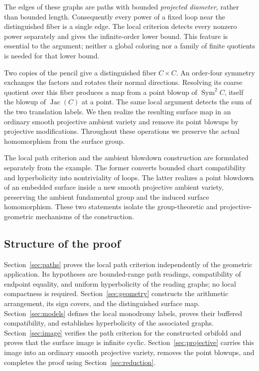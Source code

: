 \documentclass[11pt,reqno]{amsart}
\numberwithin{equation}{section}
\theoremstyle{definition}
\theoremstyle{remark}
\DeclareMathOperator{\Sym}{Sym}
\DeclareMathOperator{\Jac}{Jac}
\begin{document}
The edges of these graphs are paths with bounded \emph{projected
diameter}, rather than bounded length.  Consequently every power of a
fixed loop near the distinguished fiber is a single edge.  The local
criterion detects every nonzero power separately and gives the
infinite-order lower bound.  This feature is essential to the argument;
neither a global coloring nor a family of finite quotients is needed
for that lower bound.

Two copies of the pencil give a distinguished fiber $C\times C$.
An order-four symmetry exchanges the factors and rotates their normal
directions.  Resolving its coarse quotient over this fiber produces a
map from a point blowup of
$\Sym^2 C$, itself the blowup of $\Jac(C)$ at a point.  The same local
argument detects the sum of the two translation labels.  We then
realize the resulting surface map in an ordinary smooth projective
ambient variety and remove its point blowups by projective
modifications.  Throughout these operations we preserve the actual
homomorphism from the surface group.

The local path criterion and the ambient blowdown construction are
formulated separately from the example.  The former converts bounded
chart compatibility and hyperbolicity into nontriviality of loops.
The latter realizes a point blowdown of an embedded surface inside a
new smooth projective ambient variety, preserving the ambient
fundamental group and the induced surface homomorphism.  These two
statements isolate the group-theoretic and projective-geometric
mechanisms of the construction.

\subsection{Structure of the proof}
Section~\ref{sec:paths} proves the local path criterion independently
of the geometric application.  Its hypotheses are bounded-range path
readings, compatibility of endpoint equality, and uniform hyperbolicity
of the reading graphs; no local compactness is required.
Section~\ref{sec:geometry} constructs the arithmetic arrangement,
its sign covers, and the distinguished surface map.
Section~\ref{sec:models} defines the local monodromy labels, proves
their buffered compatibility, and establishes hyperbolicity of the
associated graphs.  Section~\ref{sec:image} verifies the path
criterion for the constructed orbifold and proves that the surface
image is infinite cyclic.  Section~\ref{sec:projective} carries this
image into an ordinary smooth projective variety, removes the point
blowups, and completes the proof using Section~\ref{sec:reduction}.
\end{document}
